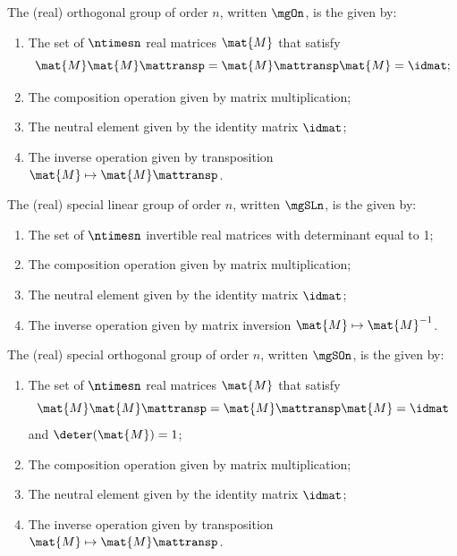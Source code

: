 \begin{definition}
    \label{def:general-orthogonal-group}
    The (real) orthogonal group of order $n$, written $\mgOn$,
    is the  given by:

    \constit
    \begin{enumerate}
        \item The set of $\ntimesn$ real matrices $\mat{M}$ that satisfy
              \begin{equation}
                  \mat{M} \mat{M}\mattransp = \mat{M}\mattransp \mat{M} = \idmat;
              \end{equation}
        \item The composition operation given by matrix multiplication;
        \item The neutral element given by the identity matrix $\idmat$;
        \item The inverse operation given by transposition $\mat{M} \mapsto \mat{M}\mattransp$.
    \end{enumerate}
\end{definition}

\begin{definition}
    \label{def:special-linear-group}
    The (real) special linear group of order $n$, written $\mgSLn$,
    is the  given by:

    \constit
    \begin{enumerate}
        \item The set of $\ntimesn$ invertible real matrices with determinant equal to 1;
        \item The composition operation given by matrix multiplication;
        \item The neutral element given by the identity matrix $\idmat$;
        \item The inverse operation given by matrix inversion $\mat{M} \mapsto \mat{M}^{-1}$.
    \end{enumerate}
\end{definition}
\begin{definition}
    \label{def:special-orthogonal-group}
    The (real) special orthogonal group of order $n$, written $\mgSOn$,
    is the  given by:

    \constit
    \begin{enumerate}
        \item The set of $\ntimesn$ real matrices $\mat{M}$ that satisfy
              \begin{equation}
                  \mat{M} \mat{M}\mattransp = \mat{M}\mattransp \mat{M} = \idmat
              \end{equation}
              and $\deter(\mat{M}) = 1$;
        \item The composition operation given by matrix multiplication;
        \item The neutral element given by the identity matrix $\idmat$;
        \item The inverse operation given by transposition $\mat{M} \mapsto \mat{M}\mattransp$.
    \end{enumerate}
\end{definition}

